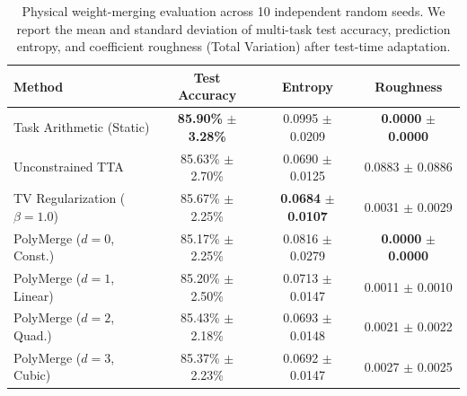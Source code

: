 \begin{table}[t]
\centering
\caption{Physical weight-merging evaluation across 10 independent random seeds. We report the mean and standard deviation of multi-task test accuracy, prediction entropy, and coefficient roughness (Total Variation) after test-time adaptation.}
\label{tab:physical_results}
\setlength{\tabcolsep}{5pt}
\begin{small}
\begin{tabular}{lccc}
\toprule
\textbf{Method} & \textbf{Test Accuracy} & \textbf{Entropy} & \textbf{Roughness} \\
\midrule
Task Arithmetic (Static) & \textbf{85.90\%} $\pm$ \textbf{3.28\%} & 0.0995 $\pm$ 0.0209 & \textbf{0.0000} $\pm$ \textbf{0.0000} \\
Unconstrained TTA & 85.63\% $\pm$ 2.70\% & 0.0690 $\pm$ 0.0125 & 0.0883 $\pm$ 0.0886 \\
TV Regularization ($\beta=1.0$) & 85.67\% $\pm$ 2.25\% & \textbf{0.0684} $\pm$ \textbf{0.0107} & 0.0031 $\pm$ 0.0029 \\
\midrule
PolyMerge ($d=0$, Const.) & 85.17\% $\pm$ 2.25\% & 0.0816 $\pm$ 0.0279 & \textbf{0.0000} $\pm$ \textbf{0.0000} \\
PolyMerge ($d=1$, Linear) & 85.20\% $\pm$ 2.50\% & 0.0713 $\pm$ 0.0147 & 0.0011 $\pm$ 0.0010 \\
PolyMerge ($d=2$, Quad.) & 85.43\% $\pm$ 2.18\% & 0.0693 $\pm$ 0.0148 & 0.0021 $\pm$ 0.0022 \\
PolyMerge ($d=3$, Cubic) & 85.37\% $\pm$ 2.23\% & 0.0692 $\pm$ 0.0147 & 0.0027 $\pm$ 0.0025 \\
\bottomrule
\end{tabular}
\end{small}
\end{table}

